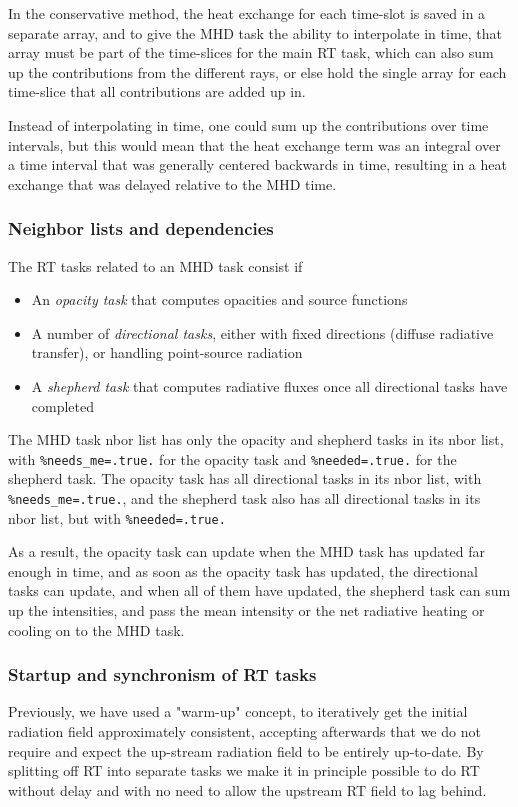\documentclass[paper=a4,fontsize=11pt]{scrartcl}
\numberwithin{equation}{section}		%
\numberwithin{figure}{section}			%
\numberwithin{table}{section}				%
\begin{document}
In the conservative method, the heat exchange for each time-slot is saved in a separate array, and to give the MHD task the ability to interpolate in time, that array must be part of the time-slices for the main RT task, which can also sum up the contributions from the different rays, or else hold the single array for each time-slice that all contributions are added up in.

Instead of interpolating in time, one could sum up the contributions over time intervals, but this would mean that the heat exchange term was an integral over a time interval that was generally centered backwards in time, resulting in a heat exchange that was delayed relative to the MHD time.

\subsubsection{Neighbor lists and dependencies}
The RT tasks related to an MHD task consist if
\begin{itemize}
    \item An \textit{opacity task} that computes opacities and source functions
    \item A number of \textit{directional tasks}, either with fixed directions (diffuse radiative transfer), or handling point-source radiation
    \item A \textit{shepherd task} that computes radiative fluxes once all directional tasks have completed
\end{itemize}
The MHD task nbor list has only the opacity and shepherd tasks in its nbor list, with \verb|%needs_me=.true.| for the opacity task and \verb|%needed=.true.| for the shepherd task. The opacity task has all directional tasks in its nbor list, with \verb|%needs_me=.true.|, and the shepherd task also has all directional tasks in its nbor list, but with \verb|%needed=.true.|

As a result, the opacity task can update when the MHD task has updated far enough in time, and as soon as the opacity task has updated, the directional tasks can update, and when all of them have updated, the shepherd task can sum up the intensities, and pass the mean intensity or the net radiative heating or cooling on to the MHD task.

\subsubsection{Startup and synchronism of RT tasks}
Previously, we have used a "warm-up" concept, to iteratively get the initial radiation field approximately consistent, accepting afterwards that we do not require and expect the up-stream radiation field to be entirely up-to-date.  By splitting off RT into separate tasks we make it in principle possible to do RT without delay and with no need to allow the upstream RT field to lag behind.
\end{document}
